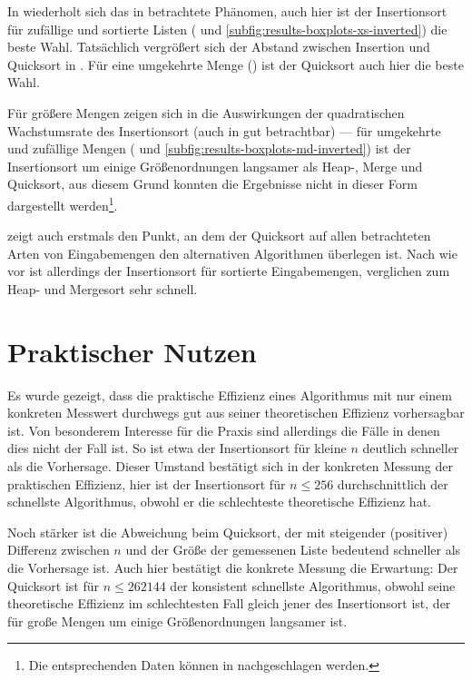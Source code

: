 

In  wiederholt sich das in  betrachtete Phänomen, auch hier ist der Insertionsort für zufällige und sortierte Listen ( und \ref{subfig:results-boxplots-xs-inverted}) die beste Wahl. Tatsächlich vergrößert sich der Abstand zwischen Insertion und Quicksort in . Für eine umgekehrte Menge () ist der Quicksort auch hier die beste Wahl.



Für größere Mengen zeigen sich in  die Auswirkungen der quadratischen Wachstumsrate des Insertionsort (auch in  gut betrachtbar) --- für umgekehrte und zufällige Mengen ( und \ref{subfig:results-boxplots-md-inverted}) ist der Insertionsort um einige Größenordnungen langsamer als Heap-, Merge und Quicksort, aus diesem Grund konnten die Ergebnisse nicht in dieser Form dargestellt werden\footnote{Die entsprechenden Daten können in  nachgeschlagen werden.}.

 zeigt auch erstmals den Punkt, an dem der Quicksort auf allen betrachteten Arten von Eingabemengen den alternativen Algorithmen überlegen ist. Nach wie vor ist allerdings der Insertionsort für sortierte Eingabemengen, verglichen zum Heap- und Mergesort sehr schnell.

\pagebreak[3]
\section{Praktischer Nutzen}

Es wurde gezeigt, dass die praktische Effizienz eines Algorithmus mit nur einem konkreten Messwert durchwegs gut aus seiner theoretischen Effizienz vorhersagbar ist. Von besonderem Interesse für die Praxis sind allerdings die Fälle in denen dies nicht der Fall ist. So ist etwa der Insertionsort für kleine $n$ deutlich schneller als die Vorhersage. Dieser Umstand bestätigt sich in der konkreten Messung der praktischen Effizienz, hier ist der Insertionsort für $n \leq 256$ durchschnittlich der schnellste Algorithmus, obwohl er die schlechteste theoretische Effizienz hat.

Noch stärker ist die Abweichung beim Quicksort, der mit steigender (positiver) Differenz zwischen $n$ und der Größe der gemessenen Liste bedeutend schneller als die Vorhersage ist. Auch hier bestätigt die konkrete Messung die Erwartung: Der Quicksort ist für $n \leq 262144$ der konsistent schnellste Algorithmus, obwohl seine theoretische Effizienz im schlechtesten Fall gleich jener des Insertionsort ist, der für große Mengen um einige Größenordnungen langsamer ist.
